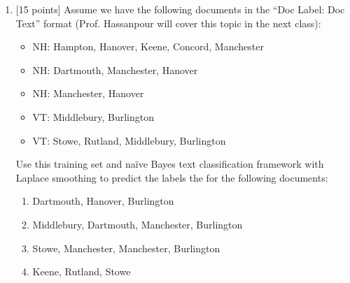 \documentclass[12pt]{article}
\newenvironment{problem}[2][Problem:]{\begin{trivlist}
\item[\hskip \labelsep {\bfseries #1}\hskip \labelsep {\bfseries #2.}]}{\end{trivlist}}
\begin{document}
\begin{problem}{Natural Language Processing [50 points]}
\begin{enumerate}
    \item {[15 points]} 
     Assume we have the following documents in the ``Doc Label: Doc Text'' format (Prof. Hassanpour will cover this topic in the next class):
     \begin{itemize}
     	\item NH: Hampton, Hanover, Keene, Concord, Manchester 
	\item NH: Dartmouth, Manchester, Hanover 
	\item NH: Manchester, Hanover 
	\item VT: Middlebury, Burlington 
	\item VT: Stowe, Rutland, Middlebury, Burlington
     \end{itemize}
     Use this training set and na\"ive Bayes text classification framework with Laplace smoothing to predict the labels the for the following documents:
    \begin{enumerate}
    	\item Dartmouth, Hanover, Burlington
    	\item Middlebury, Dartmouth, Manchester, Burlington
    	\item Stowe, Manchester, Manchester, Burlington
    	\item Keene, Rutland, Stowe
    \end{enumerate}
\end{enumerate}
\end{problem}
\end{document}
